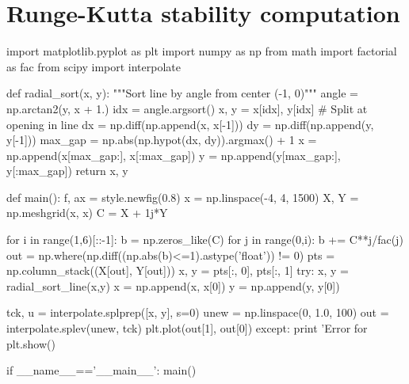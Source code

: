 \section{Runge-Kutta stability computation}
\begin{python}[label={lst:appendix_rkstab}]
import matplotlib.pyplot as plt
import numpy as np
from math import factorial as fac
from scipy import interpolate

def radial_sort(x, y):
    """Sort line by angle from center (-1, 0)"""
    angle = np.arctan2(y, x + 1.)
    idx = angle.argsort()
    x, y = x[idx], y[idx]
    # Split at opening in line
    dx = np.diff(np.append(x, x[-1]))
    dy = np.diff(np.append(y, y[-1]))
    max_gap = np.abs(np.hypot(dx, dy)).argmax() + 1
    x = np.append(x[max_gap:], x[:max_gap])
    y = np.append(y[max_gap:], y[:max_gap])
    return x, y

def main():
    f, ax = style.newfig(0.8)
    x = np.linspace(-4, 4, 1500)
    X, Y = np.meshgrid(x, x)
    C = X + 1j*Y

    for i in range(1,6)[::-1]:
        b = np.zeros_like(C)
        for j in range(0,i):
            b += C**j/fac(j)
        out = np.where(np.diff((np.abs(b)<=1).astype('float')) != 0)
        pts = np.column_stack((X[out], Y[out]))
        x, y = pts[:, 0], pts[:, 1]
        try:
            x, y = radial_sort_line(x,y)
            x = np.append(x, x[0])
            y = np.append(y, y[0])

            tck, u = interpolate.splprep([x, y], s=0)
            unew = np.linspace(0, 1.0, 100)
            out = interpolate.splev(unew, tck)
            plt.plot(out[1], out[0])
        except:
            print 'Error for %
    plt.show()

if __name__=='__main__':
    main()

\end{python}
\clearpage

